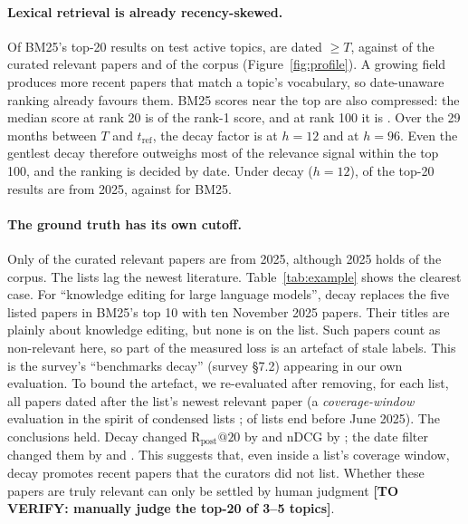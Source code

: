 \documentclass[acmsmall]{acmart}
\makeatletter
\newcommand{\Rpost}{\mathrm{R}_{\text{post}}@20}
\newcommand{\TODO}[1]{\textbf{[TO VERIFY: #1]}}
\makeatother
\begin{document}
\paragraph{Lexical retrieval is already recency-skewed.} Of BM25's top-20 results on test active topics, \BMPostShare{} are dated $\geq T$, against \RelPostShare{} of the curated relevant papers and \CorpusPostShare{} of the corpus (Figure~\ref{fig:profile}). A growing field produces more recent papers that match a topic's vocabulary, so date-unaware ranking already favours them. BM25 scores near the top are also compressed: the median score at rank 20 is \RatioTwenty{} of the rank-1 score, and at rank 100 it is \RatioHundred. Over the 29 months between $T$ and $t_{\text{ref}}$, the decay factor is \DecayFacTwelve{} at $h=12$ and \DecayFacNinetySix{} at $h=96$. Even the gentlest decay therefore outweighs most of the relevance signal within the top 100, and the ranking is decided by date. Under decay ($h=12$), \ShareTwentyFiveDecay{} of the top-20 results are from 2025, against \ShareTwentyFiveBM{} for BM25.

\paragraph{The ground truth has its own cutoff.} Only \ShareTwentyFiveRel{} of the curated relevant papers are from 2025, although 2025 holds \ShareTwentyFiveCorpus{} of the corpus. The lists lag the newest literature. Table~\ref{tab:example} shows the clearest case. For ``knowledge editing for large language models'', decay replaces the five listed papers in BM25's top 10 with ten November 2025 papers. Their titles are plainly about knowledge editing, but none is on the list. Such papers count as non-relevant here, so part of the measured loss is an artefact of stale labels. This is the survey's ``benchmarks decay'' (survey \S7.2) appearing in our own evaluation. To bound the artefact, we re-evaluated after removing, for each list, all papers dated after the list's newest relevant paper (a \emph{coverage-window} evaluation in the spirit of condensed lists \cite{sakai2007bpref}; \NListsWindowEarly{} of \NLists{} lists end before June 2025). The conclusions held. Decay changed $\Rpost$ by \CondDecdRpost{} and nDCG by \CondDecdnDCG; the date filter changed them by \CondDFdRpost{} and \CondDFdnDCG. This suggests that, even inside a list's coverage window, decay promotes recent papers that the curators did not list. Whether these papers are truly relevant can only be settled by human judgment \TODO{manually judge the top-20 of 3--5 topics}.
\end{document}
